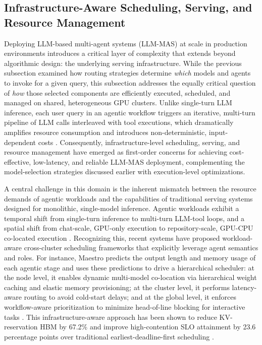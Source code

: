 \documentclass[11pt]{article}
\begin{document}
\subsection{Infrastructure-Aware Scheduling, Serving, and Resource Management}

Deploying LLM-based multi-agent systems (LLM-MAS) at scale in production environments introduces a critical layer of complexity that extends beyond algorithmic design: the underlying serving infrastructure. While the previous subsection examined how routing strategies determine \emph{which} models and agents to invoke for a given query, this subsection addresses the equally critical question of \emph{how} those selected components are efficiently executed, scheduled, and managed on shared, heterogeneous GPU clusters. Unlike single-turn LLM inference, each user query in an agentic workflow triggers an iterative, multi-turn pipeline of LLM calls interleaved with tool executions, which dramatically amplifies resource consumption and introduces non-deterministic, input-dependent costs \cite{ref294}. Consequently, infrastructure-level scheduling, serving, and resource management have emerged as first-order concerns for achieving cost-effective, low-latency, and reliable LLM-MAS deployment, complementing the model-selection strategies discussed earlier with execution-level optimizations.

A central challenge in this domain is the inherent mismatch between the resource demands of agentic workloads and the capabilities of traditional serving systems designed for monolithic, single-model inference. Agentic workloads exhibit a temporal shift from single-turn inference to multi-turn LLM-tool loops, and a spatial shift from chat-scale, GPU-only execution to repository-scale, GPU-CPU co-located execution \cite{ref295}. Recognizing this, recent systems have proposed workload-aware cross-cluster scheduling frameworks that explicitly leverage agent semantics and roles. For instance, Maestro predicts the output length and memory usage of each agentic stage and uses these predictions to drive a hierarchical scheduler: at the node level, it enables dynamic multi-model co-location via hierarchical weight caching and elastic memory provisioning; at the cluster level, it performs latency-aware routing to avoid cold-start delays; and at the global level, it enforces workflow-aware prioritization to minimize head-of-line blocking for interactive tasks \cite{ref294}. This infrastructure-aware approach has been shown to reduce KV-reservation HBM by 67.2\% and improve high-contention SLO attainment by 23.6 percentage points over traditional earliest-deadline-first scheduling \cite{ref294}.
\end{document}
